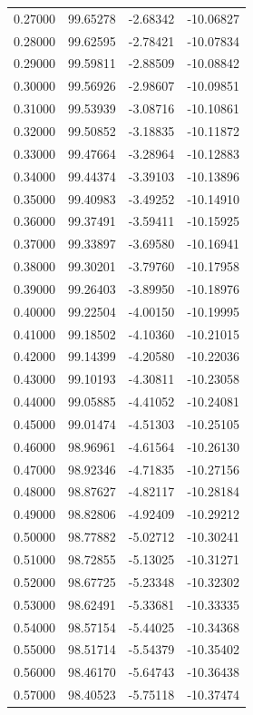 \begin{table}
\begin{tabular}{llll}
0.27000 & 99.65278 & -2.68342 & -10.06827 \\
0.28000 & 99.62595 & -2.78421 & -10.07834 \\
0.29000 & 99.59811 & -2.88509 & -10.08842 \\
0.30000 & 99.56926 & -2.98607 & -10.09851 \\
0.31000 & 99.53939 & -3.08716 & -10.10861 \\
0.32000 & 99.50852 & -3.18835 & -10.11872 \\
0.33000 & 99.47664 & -3.28964 & -10.12883 \\
0.34000 & 99.44374 & -3.39103 & -10.13896 \\
0.35000 & 99.40983 & -3.49252 & -10.14910 \\
0.36000 & 99.37491 & -3.59411 & -10.15925 \\
0.37000 & 99.33897 & -3.69580 & -10.16941 \\
0.38000 & 99.30201 & -3.79760 & -10.17958 \\
0.39000 & 99.26403 & -3.89950 & -10.18976 \\
0.40000 & 99.22504 & -4.00150 & -10.19995 \\
0.41000 & 99.18502 & -4.10360 & -10.21015 \\
0.42000 & 99.14399 & -4.20580 & -10.22036 \\
0.43000 & 99.10193 & -4.30811 & -10.23058 \\
0.44000 & 99.05885 & -4.41052 & -10.24081 \\
0.45000 & 99.01474 & -4.51303 & -10.25105 \\
0.46000 & 98.96961 & -4.61564 & -10.26130 \\
0.47000 & 98.92346 & -4.71835 & -10.27156 \\
0.48000 & 98.87627 & -4.82117 & -10.28184 \\
0.49000 & 98.82806 & -4.92409 & -10.29212 \\
0.50000 & 98.77882 & -5.02712 & -10.30241 \\
0.51000 & 98.72855 & -5.13025 & -10.31271 \\
0.52000 & 98.67725 & -5.23348 & -10.32302 \\
0.53000 & 98.62491 & -5.33681 & -10.33335 \\
0.54000 & 98.57154 & -5.44025 & -10.34368 \\
0.55000 & 98.51714 & -5.54379 & -10.35402 \\
0.56000 & 98.46170 & -5.64743 & -10.36438 \\
0.57000 & 98.40523 & -5.75118 & -10.37474 \\

\end{tabular}
\end{table}
